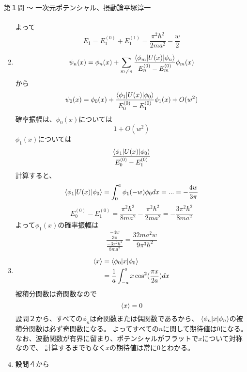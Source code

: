 \begin{answer}{第１問 〜 一次元ポテンシャル、摂動論}{平塚淳一}
\begin{enumerate}
\begin{align}
  \end{align}
  よって
  \begin{equation}
  E_1=E_1^{(0)}+E_1^{(1)}
  =\frac{\pi^2\hbar^2}{2ma^2}- \frac{w}{2}
  \end{equation}
\item
  \begin{equation}
  \psi_n(x)=\phi_n(x)+\sum _{m\ne n} \frac{\langle\phi_m|U(x)|\phi_n\rangle}{E_n^{(0)}-E_m^{(0)}}\phi_m(x)
  \end{equation}
  から
  \begin{equation}
  \psi_0(x)=\phi_0(x)+\frac{\langle\phi_1|U(x)|\phi_0\rangle}{E_0^{(0)}-E_1^{(0)}}\phi_1(x)+O(w^2)
  \end{equation}
  確率振幅は、$\phi_0(x)$については
  \begin{equation}
  1+O(w^2)
  \end{equation}
  $\phi_1(x)$については
  \begin{equation}
  \frac{\langle\phi_1|U(x)|\phi_0\rangle}{E_0^{(0)}-E_1^{(0)}}
  \end{equation}
  計算すると、
  \begin{equation}
  {\langle\phi_1|U(x)|\phi_0\rangle}=\int _0^a \phi_1 (-w) \phi_0 dx=...=- \frac{4w}{3\pi}
  \end{equation}
  \begin{equation}
  E_0^{(0)}-E_1^{(0)}=\frac{\pi^2\hbar^2}{8ma^2} - \frac{\pi^2\hbar^2}{2ma^2}
  =-\frac{3 \pi^2\hbar^2}{8ma^2}
  \end{equation}
  よって$\phi_1(x)$の確率振幅は
  \begin{equation}
  \frac{\frac{- 4w}{3\pi}}{\frac{-3\pi^2\hbar^2}{8ma^2}}=\frac{32ma^2w}{9\pi^3\hbar^2}
  \end{equation}
\item
  \begin{align}
  \langle x\rangle&=\langle\phi_0|x|\phi_0\rangle \\
  &=\frac{1}{a} \int_{-a}^a x\cos^2(\frac{\pi x}{2a})dx
  \end{align}
  被積分関数は奇関数なので
  \begin{equation}
  \langle x\rangle=0
  \end{equation}
  設問２から、すべての$\phi_n$は奇関数または偶関数であるから、
  $\langle\phi_n|x|\phi_n\rangle$の被積分関数は必ず奇関数になる。
  よってすべての$n$に関して期待値は0になる。\\
  なお、波動関数が有界に留まり、ポテンシャルがフラットで$x$について対称なので、
  計算するまでもなく$x$の期待値は常に0とわかる。
\item 設問４から
  \begin{equation}

\end{equation}
\end{enumerate}
\end{answer}
